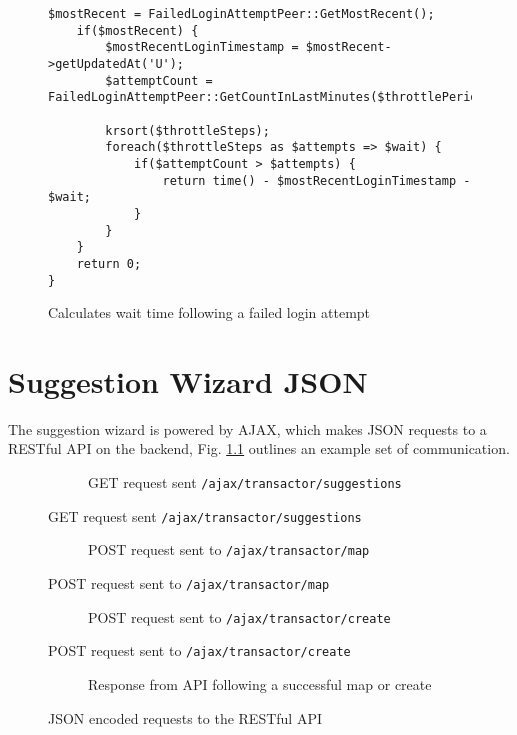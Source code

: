 \begin{appendices}
\begin{figure}
\begin{lstlisting}[style=phpcolor]
	$mostRecent = FailedLoginAttemptPeer::GetMostRecent();		
	if($mostRecent) {
		$mostRecentLoginTimestamp = $mostRecent->getUpdatedAt('U');
		$attemptCount = FailedLoginAttemptPeer::GetCountInLastMinutes($throttlePeriodMinutes);
		
		krsort($throttleSteps);
		foreach($throttleSteps as $attempts => $wait) {
			if($attemptCount > $attempts) {
				return time() - $mostRecentLoginTimestamp - $wait;
			}
		}
	}
	return 0;
}
\end{lstlisting}
\caption{Calculates wait time following a failed login attempt}
\label{fig:getThrottlingWaitSeconds}
\end{figure}

\chapter{Suggestion Wizard JSON}

The suggestion wizard is powered by AJAX, which makes JSON requests to a RESTful API on the backend, Fig. \ref{fig:json-examples} outlines an example set of communication.

\begin{figure}
    \begin{subfigure}[a]{\textwidth}
        
        \caption{GET request sent \lstinline{/ajax/transactor/suggestions}}
    \end{subfigure}
\end{figure}

\begin{figure}
    \ContinuedFloat
    \begin{subfigure}[b]{\textwidth}
        
        \caption{POST request sent to \lstinline{/ajax/transactor/map}}
    \end{subfigure}
\end{figure}

\begin{figure}
    \ContinuedFloat   
    \begin{subfigure}[c]{\textwidth}
        
        \caption{POST request sent to \lstinline{/ajax/transactor/create}}
    \end{subfigure}
\end{figure}

\begin{figure}
    \ContinuedFloat  
    \begin{subfigure}[d]{\textwidth}
        
        \caption{Response from API following a successful map or create}
    \end{subfigure}    

    \caption{JSON encoded requests to the RESTful API}
    \label{fig:json-examples}
\end{figure}

\end{appendices}
